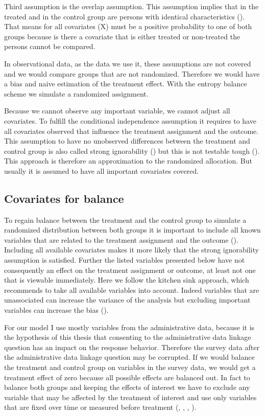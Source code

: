 Third assumption is the overlap assumption. This assumption implies that in the treated and in the control group are persons with identical characteristics (\cite{Heckmanetal98}). That means for all covariates (X) must be a positive probability to one of both groups because is there a covariate that is either treated or non-treated the persons cannot be compared.

In observational data, as the data we use it, these assumptions are not covered and we would compare groups that are not randomized. Therefore we would have a bias and naive estimation of the treatment effect. With the entropy balance scheme we simulate a randomized assignment.

Because we cannot observe any important variable, we cannot adjust all covariates. To fulfill the conditional independence assumption it requires to have all covariates observed that influence the treatment assignment and the outcome. This assumption to have no unobserved differences between the treatment and control group is also called strong ignorability (\cite{Stuart10}) but this is not testable tough (\cite{Imbens04}). This approach is therefore an approximation to the randomized allocation. But usually it is assumed to have all important covariates covered.

\subsection{Covariates for balance}\label{covar}
	
To regain balance between the treatment and the control group to simulate a randomized distribution between both groups it is important to include all known variables that are related to the treatment assignment and the outcome (\cite{Stuart10}). Including all available covariates makes it more likely that the strong ignorability assumption is satisfied. Further the listed variables presented below have not consequently an effect on the treatment assignment or outcome, at least not one that is viewable immediately. Here we follow the kitchen sink approach, which recommends to take all available variables into account. Indeed variables that are unassociated can increase the variance of the analysis but excluding important variables can increase the bias (\cite{Stuart10}).

For our model I use mostly variables from the administrative data, because it is the hypothesis of this thesis that consenting to the administrative data linkage question has an impact on the response behavior. Therefore the survey data after the administrative data linkage question may be corrupted. If we would balance the treatment and control group on variables in the survey data, we would get a treatment effect of zero because all possible effects are balanced out. In fact to balance both groups and keeping the effects of interest we have to exclude any variable that may be affected by the treatment of interest and use only variables that are fixed over time or measured before treatment (\cite{Rosenbaum84}, \cite{Frangakisetal02}, \cite{Greenland03}, \cite{Caliendoetal08}).

